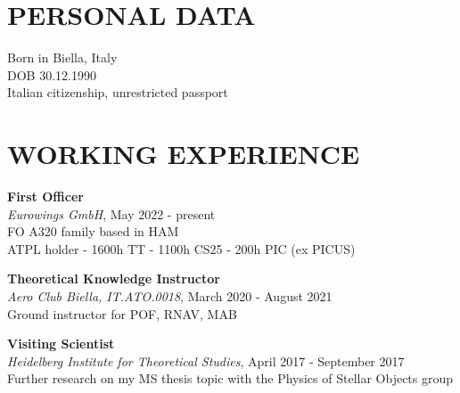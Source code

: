 \documentclass[margin]{res}
\begin{document}
\begin{resume}


\section{PERSONAL DATA}
Born in Biella, Italy\\
DOB 30.12.1990\\
Italian citizenship, unrestricted passport

\section{WORKING EXPERIENCE}


\textbf{First Officer}\\
{\sl Eurowings GmbH}, May 2022 - present\\
FO A320 family based in HAM\\
ATPL holder - 1600h TT - 1100h CS25 - 200h PIC (ex PICUS)

\textbf{Theoretical Knowledge Instructor}\\
{\sl Aero Club Biella, IT.ATO.0018}, March 2020 - August 2021\\
Ground instructor for POF, RNAV, MAB

\textbf{Visiting Scientist}\\
{\sl Heidelberg Institute for Theoretical Studies}, April 2017 - September 2017\\
Further research on my MS thesis topic with the Physics of Stellar Objects group




\end{resume}
\end{document}
